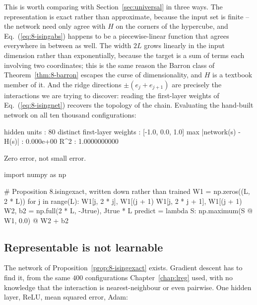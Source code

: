 This is worth comparing with Section~\ref{sec:universal} in three ways.  The
representation is exact rather than approximate, because the input set is
finite -- the network need only agree with $H$ on the corners of the
hypercube, and Eq.~(\ref{eq:8-isingabs}) happens to be a piecewise-linear
function that agrees everywhere in between as well.  The width $2L$ grows
linearly in the input dimension rather than exponentially, because the target
is a sum of terms each involving two coordinates; this is the same reason the
Barron class of Theorem~\ref{thm:8-barron} escapes the curse of dimensionality,
and $H$ is a textbook member of it.  And the ridge directions $\pm(e_j+e_{j+1})$
are precisely the interactions we are trying to discover: reading the
first-layer weights of Eq.~(\ref{eq:8-isingnet}) recovers the topology of the
chain.  Evaluating the hand-built network on all ten thousand configurations:

\begin{Python}{}
    hidden units                                : 80
    distinct first-layer weights                : [-1.0, 0.0, 1.0]
    max |network(s) - H(s)|                     : 0.000e+00
    R^2                                         : 1.0000000000
\end{Python}

Zero error, not small error.

\begin{Python}{}
import numpy as np

# Proposition 8.isingexact, written down rather than trained
W1 = np.zeros((L, 2 * L))
for j in range(L):
    W1[j, 2 * j], W1[(j + 1) %
    W1[j, 2 * j + 1], W1[(j + 1) %
W2, b2 = np.full(2 * L, -Jtrue), Jtrue * L
predict = lambda S: np.maximum(S @ W1, 0.0) @ W2 + b2
\end{Python}

\subsection{Representable is not learnable}
\label{sec:isinglearn}

The network of Proposition~\ref{prop:8-isingexact} exists.  Gradient descent
has to find it, from the same $400$ configurations Chapter~\ref{chap:lreg}
used, with no knowledge that the interaction is nearest-neighbour or even
pairwise.  One hidden layer, ReLU, mean squared error, Adam:

